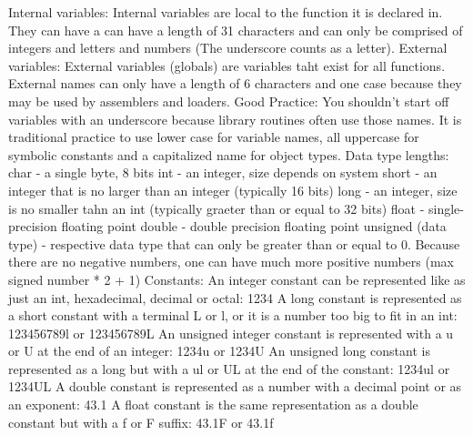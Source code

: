 Internal variables:\newline
Internal variables are local to the function it is declared in. They can have a can have a length of 31 characters and can only be comprised of integers and letters and numbers (The underscore counts as a letter). 
External variables:\newline
External variables (globals) are variables taht exist for all functions. External names can only have a length of 6 characters and one case because they may be used by assemblers and loaders.
Good Practice:\newline
You shouldn't start off variables with an underscore because library routines often use those names. It is traditional practice to use lower case for variable names, all uppercase for symbolic constants and a capitalized name for object types. 
Data type lengths:\newline
char - a single byte, 8 bits
int - an integer, size depends on system
short - an integer that is no larger than an integer (typically 16 bits)
long - an integer, size is no smaller tahn an int (typically graeter than or equal to 32 bits)
float - single-precision floating point
double - double precision floating point
unsigned (data type) - respective data type that can only be greater than or equal to 0. Because there are no negative numbers, one can have much more positive numbers (max signed number * 2 + 1) 
Constants:\newline
An integer constant can be represented like as just an int, hexadecimal, decimal or octal: 1234
A long constant is represented as a short constant with a terminal L or l, or it is a number too big to fit in an int: 123456789l or 123456789L
An unsigned integer constant is represented with a u or U at the end of an integer: 1234u or 1234U
An unsigned long constant is represented as a long but with a ul or UL at the end of the constant: 1234ul or 1234UL
A double constant is represented as a number with a decimal point or as an exponent: 43.1
A float constant is the same representation as a double constant but with a f or F suffix: 43.1F or 43.1f
